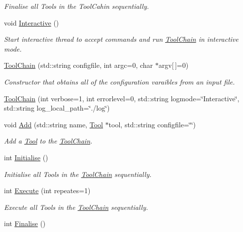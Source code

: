 \begin{DoxyCompactItemize}
\begin{DoxyCompactList}\small\item\em Finalise all Tools in the Tool\-Cahin sequentially. \end{DoxyCompactList}\item 
\hypertarget{classToolChain_a9bb47b83b6b85c3b0fab75af0cda19bf}{void \hyperlink{classToolChain_a9bb47b83b6b85c3b0fab75af0cda19bf}{Interactive} ()}\label{classToolChain_a9bb47b83b6b85c3b0fab75af0cda19bf}

\begin{DoxyCompactList}\small\item\em Start interactive thread to accept commands and run \hyperlink{classToolChain}{Tool\-Chain} in interactive mode. \end{DoxyCompactList}\item 
\hyperlink{classToolChain_a133e224899a743ee4a679396f8569bf9}{Tool\-Chain} (std\-::string configfile, int argc=0, char $\ast$argv\mbox{[}$\,$\mbox{]}=0)
\begin{DoxyCompactList}\small\item\em Constructor that obtains all of the configuration varaibles from an input file. \end{DoxyCompactList}\item 
\hyperlink{classToolChain_aa55cb52b21892009313568f60d5dcdb6}{Tool\-Chain} (int verbose=1, int errorlevel=0, std\-::string logmode=\char`\"{}Interactive\char`\"{}, std\-::string log\-\_\-local\-\_\-path=\char`\"{}./log\char`\"{})
\item 
void \hyperlink{classToolChain_a4da0c02154a0597704e58836d6607e61}{Add} (std\-::string name, \hyperlink{classTool}{Tool} $\ast$tool, std\-::string configfile=\char`\"{}\char`\"{})
\begin{DoxyCompactList}\small\item\em Add a \hyperlink{classTool}{Tool} to the \hyperlink{classToolChain}{Tool\-Chain}. \end{DoxyCompactList}\item 
\hypertarget{classToolChain_a341f343926341b82a29c586a7b9683af}{int \hyperlink{classToolChain_a341f343926341b82a29c586a7b9683af}{Initialise} ()}\label{classToolChain_a341f343926341b82a29c586a7b9683af}

\begin{DoxyCompactList}\small\item\em Initialise all Tools in the \hyperlink{classToolChain}{Tool\-Chain} sequentially. \end{DoxyCompactList}\item 
int \hyperlink{classToolChain_a303e299293fd4d3a5e91865e04898e52}{Execute} (int repeates=1)
\begin{DoxyCompactList}\small\item\em Execute all Tools in the \hyperlink{classToolChain}{Tool\-Chain} sequentially. \end{DoxyCompactList}\item 
\hypertarget{classToolChain_a3828756135773fb9ca4b361a47296dd9}{int \hyperlink{classToolChain_a3828756135773fb9ca4b361a47296dd9}{Finalise} ()}\label{classToolChain_a3828756135773fb9ca4b361a47296dd9}


\end{DoxyCompactItemize}
